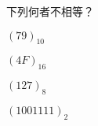 \ifx\ntpcNinetyThree\undefined[93學年基北區] \fi
下列何者不相等？
  \begin{optionlist}
  \item ${(79)}_{10}$
  \item ${(4F)}_{16}$
  \item ${(127)}_{8}$\label{ntpc-93-a14}
  \item ${(1001111)}_{2}$
  \end{optionlist}